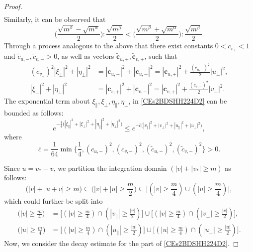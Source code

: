 \documentclass[reqno]{amsart}
\numberwithin{equation}{section}
\numberwithin{equation}{section}
\begin{document}
\begin{proof}
\begin{equation*}
\begin{split}
			\end{split}
		\end{equation*}
		Similarly, it can be observed that
		\begin{equation*}
			\big(\frac{\sqrt{m^\beta}-\sqrt{m^\alpha}}{2}\big) :\frac{\sqrt{m^\beta}}{2}< \big(\frac{\sqrt{m^\beta}+\sqrt{m^\alpha}}{2}\big):\frac{\sqrt{m^\beta}}{2}.
		\end{equation*}
		Through a process analogous to the above that there exist constants 
		$0<c_{v_{\perp}}<1$ and $\tilde{c}_{u,-}, \tilde{c}_{v,-}>0$, as well as vectors $\tilde{\mathbf{c}}_{u,+},\tilde{\mathbf{c}}_{v,+}$, such that
		\begin{equation*}
			\begin{split}
				(c_{v_\perp})^2|\xi_{\perp}|^2+|\eta_{\perp}|^2&= |\mathbf{c}_{u,+}|^2+|\mathbf{c}_{u,-}|^2=|\mathbf{c}_{u,+}|^2+\frac{(c_{u,-})^2}{2}|u_{\perp}|^2,\\
				|\xi_{\perp}|^2+|\eta_{\perp}|^2&= |\mathbf{c}_{v,+}|^2+|\mathbf{c}_{v,-}|^2=|\mathbf{c}_{v,+}|^2+\frac{(c_{v,-})^2}{2}|v_{\perp}|^2.
			\end{split}
		\end{equation*}
		The exponential term about $\xi_{\parallel},\xi_{\perp},\eta_{\parallel},\eta_{\perp}$, in \eqref{CEs2BDSHH224D2} can be bounded as follows:
		\begin{equation}\label{k2alpneqbetdecayzb}
			e^{-\frac{1}{4}\big(|\xi_{\parallel}|^2+|\xi_{\perp}|^2+|\eta_{\parallel}|^2+|\eta_{\perp}|^2\big)} \leq e^{-\bar{c}\big(|v_{\parallel}|^2+|v_{\perp}|^2+|u_{\parallel}|^2+|u_{\perp}|^2\big)},
		\end{equation}
		where 
		\begin{equation*}
			\bar{c}=\frac{1}{64}\min\Big\{\frac{1}{4},(c_{u,-})^2,(c_{v,-})^2,(\tilde{c}_{u,-})^2,(\tilde{c}_{v,-})^2\Big\}>0.
		\end{equation*}
	
		Since $u=v_*- v$, we partition the integration domain $(|v|+|v_*|\geq m)$ as follows:
		\begin{equation*}
			\big(|v|+|u+v|\geq m\big)\subseteq \big(|v|+|u|\geq \frac{m}{2}\big)\subseteq\Big[(|v|\geq \frac{m}{4})\cup(|u|\geq \frac{m}{4})\Big],
		\end{equation*}
		which could further be split into
		\begin{equation*}
			\begin{split}
				\big(|v|\geq \frac{m}{4}\big)&=\Big[(|v|\geq \frac{m}{4})\cap(|v_{\parallel}|\geq \frac{|v|}{2})\Big]\cup\Big[(|v|\geq \frac{m}{4})\cap(|v_{\perp}|\geq \frac{|v|}{2})\Big],\\
				\big(|u|\geq \frac{m}{4}\big)&=\Big[(|u|\geq \frac{m}{4})\cap(|u_{\parallel}|\geq \frac{|u|}{2})\Big]\cup\Big[(|u|\geq \frac{m}{4})\cap(|u_{\perp}|\geq \frac{|u|}{2})\Big].
			\end{split}
		\end{equation*}
		Now, we consider the decay estimate for the part of \eqref{CEs2BDSHH224D2}.
		

\end{proof}
\end{document}

